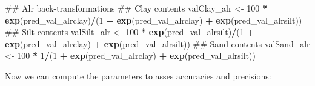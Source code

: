 \documentclass[]{book}
\newenvironment{Shaded}{\begin{snugshade}}{\end{snugshade}}
\newcommand{\DecValTok}[1]{\textcolor[rgb]{0.00,0.00,0.81}{#1}}
\newcommand{\KeywordTok}[1]{\textcolor[rgb]{0.13,0.29,0.53}{\textbf{#1}}}
\newcommand{\NormalTok}[1]{#1}
\newcommand{\OperatorTok}[1]{\textcolor[rgb]{0.81,0.36,0.00}{\textbf{#1}}}
\newcommand{\StringTok}[1]{\textcolor[rgb]{0.31,0.60,0.02}{#1}}
\begin{document}
\begin{Shaded}
\begin{Highlighting}[]
\NormalTok{## Alr back-transformations}
\NormalTok{## Clay contents}
\NormalTok{valClay_alr <-}\StringTok{ }\DecValTok{100} \OperatorTok{*}\StringTok{ }\KeywordTok{exp}\NormalTok{(pred_val_alrclay)}\OperatorTok{/}\NormalTok{(}\DecValTok{1} \OperatorTok{+}\StringTok{ }\KeywordTok{exp}\NormalTok{(pred_val_alrclay) }\OperatorTok{+}\StringTok{ }\KeywordTok{exp}\NormalTok{(pred_val_alrsilt))}
\NormalTok{## Silt contents}
\NormalTok{valSilt_alr <-}\StringTok{ }\DecValTok{100} \OperatorTok{*}\StringTok{ }\KeywordTok{exp}\NormalTok{(pred_val_alrsilt)}\OperatorTok{/}\NormalTok{(}\DecValTok{1} \OperatorTok{+}\StringTok{ }\KeywordTok{exp}\NormalTok{(pred_val_alrclay) }\OperatorTok{+}\StringTok{ }\KeywordTok{exp}\NormalTok{(pred_val_alrsilt))}
\NormalTok{## Sand contents}
\NormalTok{valSand_alr <-}\StringTok{ }\DecValTok{100} \OperatorTok{*}\StringTok{ }\DecValTok{1}\OperatorTok{/}\NormalTok{(}\DecValTok{1} \OperatorTok{+}\StringTok{ }\KeywordTok{exp}\NormalTok{(pred_val_alrclay) }\OperatorTok{+}\StringTok{ }\KeywordTok{exp}\NormalTok{(pred_val_alrsilt))}
\end{Highlighting}
\end{Shaded}

Now we can compute the parameters to asses accuracies and precisions:
\end{document}
